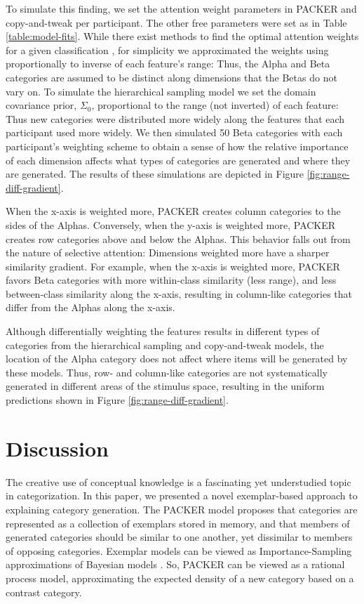 \documentclass[10pt,letterpaper]{article}
\begin{document}
To simulate this finding, we set the attention weight parameters in PACKER and copy-and-tweak per participant. The other free parameters were set as in Table \ref{table:model-fits}. While there exist methods to find the optimal attention weights for a given classification \citep[see][]{vanpaemel2012using}, for simplicity we approximated the weights using proportionally to inverse of each feature's range: Thus, the Alpha and Beta categories are assumed to be distinct along dimensions that the Betas do not vary on. To simulate the hierarchical sampling model we set the domain covariance prior, $\Sigma_0$, proportional to the range (not inverted) of each feature: Thus new categories were distributed more widely along the features that each participant used more widely. We then simulated 50 Beta categories with each participant's weighting scheme to obtain a sense of how the relative importance of each dimension affects what types of categories are generated and where they are generated. The results of these simulations are depicted in Figure \ref{fig:range-diff-gradient}.

When the x-axis is weighted more, PACKER creates column categories to the sides of the Alphas. Conversely, when the y-axis is weighted more, PACKER creates row categories above and below the Alphas. This behavior falls out from the nature of selective attention: Dimensions weighted more have a sharper similarity gradient. For example, when the x-axis is weighted more, PACKER favors Beta categories with more within-class similarity (less range), and less between-class similarity along the x-axis, resulting in column-like categories that differ from the Alphas along the x-axis.

Although differentially weighting the features results in different types of categories from the hierarchical sampling and copy-and-tweak models, the location of the Alpha category does not affect where items will be generated by these models. Thus, row- and column-like categories are not systematically generated in different areas of the stimulus space, resulting in the uniform predictions shown in Figure \ref{fig:range-diff-gradient}.

\section{Discussion}
The creative use of conceptual knowledge is a fascinating yet understudied topic in categorization. In this paper, we presented a novel exemplar-based approach to explaining category generation. The PACKER model proposes that categories are represented as a collection of exemplars stored in memory, and that members of generated categories should be similar to one another, yet dissimilar to members of opposing categories. Exemplar models can be viewed as Importance-Sampling approximations of Bayesian models \citep{shi10}. So, PACKER can be viewed as a rational process model, approximating the expected density of a new category based on a contrast category. 
\end{document}
